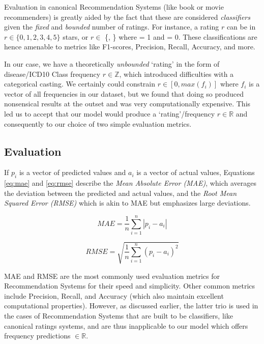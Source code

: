 \documentclass[twoside,11pt]{article}
\begin{document}
{Evaluation in canonical Recommendation Systems (like book or movie recommenders) is greatly aided by the fact that these are considered \textit{classifiers} given the \textit{fixed} and \textit{bounded} number of ratings. For instance, a rating $r$ can be in $r\in\{0,1,2,3,4,5\}$ stars, or $r\in$ \{\faThumbsOUp, \faThumbsODown\} where \faThumbsOUp = 1 and \faThumbsODown = 0. These classifications are hence amenable to metrics like F1-scores, Precision, Recall, Accuracy, and more.

In our case, we have a theoretically \textit{unbounded} `rating' in the form of disease/ICD10 Class frequency $r\in\mathbb{Z}$, which introduced difficulties with a categorical casting. We certainly could constrain $r\in[0, max(f_i)]$ where $f_i$ is a vector of all frequencies in our dataset, but we found that doing so  produced nonsensical results at the outset and was very computationally expensive. This led us to accept that our model would produce a `rating'/frequency $r\in\mathbb{R}$ and consequently to our choice of two simple evaluation metrics.

\subsection{Evaluation}

If $p_i$ is a vector of predicted values and $a_i$ is a vector of actual values, Equations \ref{eq:mae} and \ref{eq:rmse} describe the \textit{Mean Absolute Error (MAE)}, which averages the deviation between the predicted and actual values, and the \textit{Root Mean Squared Error (RMSE)} which is akin to MAE but emphasizes large deviations.

\begin{equation}
  MAE = \frac{1}{n} \sum_{i = 1}^{n}|p_i - a_i|
  \label{eq:mae}
\end{equation}

\begin{equation}
  RMSE = \sqrt{\frac{1}{n} \sum_{i = 1}^{n}(p_i - a_i)^2}
  \label{eq:rmse}
\end{equation}

MAE and RMSE are the most commonly used evaluation metrics for Recommendation Systems for their speed and simplicity. Other common metrics include Precision, Recall, and Accuracy (which also maintain excellent computational properties). However, as discussed earlier, the latter trio is used in the cases of Recommendation Systems that are built to be classifiers, like canonical ratings systems, and are thus inapplicable to our model which offers frequency predictions $\in\mathbb{R}$.

}
\end{document}
